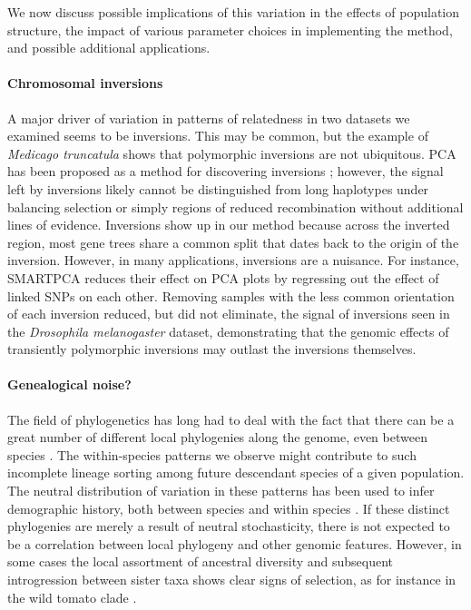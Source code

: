 \documentclass[11pt, oneside]{article}   	%
\newcommand\citep{\cite}
\renewcommand{\revpoint}[2]{\relax}
\renewcommand{\llabel}[1]{\relax}
\begin{document}
We now discuss possible implications of this variation in the effects of population structure,
the impact of various parameter choices in implementing the method,
and possible additional applications.


\paragraph{Chromosomal inversions}
A major driver of variation in patterns of relatedness in two datasets we examined seems to be inversions.
This may be common,
but the example of \textit{Medicago truncatula} shows that polymorphic inversions are not ubiquitous.
PCA has been proposed as a method for discovering inversions \citep{ma2012investigation};
however, the signal left by inversions likely cannot be distinguished from long haplotypes under balancing selection 
or simply regions of reduced recombination
without additional lines of evidence.  \llabel{ll:inversion_caveat}
Inversions show up in our method because across the inverted region,
most gene trees share a common split that dates back to the origin of the inversion.
However, in many applications, inversions are a nuisance.
For instance, SMARTPCA \citep{patterson2006population} reduces their effect on PCA plots
by regressing out the effect of linked SNPs on each other.
Removing samples with the less common orientation of each inversion reduced,
but did not eliminate, the signal of inversions
seen in the \textit{Drosophila melanogaster} dataset,
demonstrating that the genomic effects of transiently polymorphic inversions
may outlast the inversions themselves.

\paragraph{Genealogical noise?} \revpoint{AE}{6}
The field of phylogenetics has long had to deal with the fact that 
there can be a great number of different local phylogenies along the genome,
even between species
\citep{avise1983mitochondrial,pamilo1988relationships,hobolth2007genomic}.
The within-species patterns we observe might contribute to such
incomplete lineage sorting among future descendant species of a given population.
The neutral distribution of variation in these patterns 
has been used to infer demographic history,
both between species \citep{slatkin2006concordance}
and within species \citep{beeravolu2018blockwise}.
If these distinct phylogenies are merely a result of neutral stochasticity,
there is not expected to be a correlation between local phylogeny
and other genomic features.
However, in some cases the local assortment of ancestral diversity 
and subsequent introgression between sister taxa
shows clear signs of selection, 
as for instance in the wild tomato clade \citep{pease2016phylogenomics}.
\end{document}
